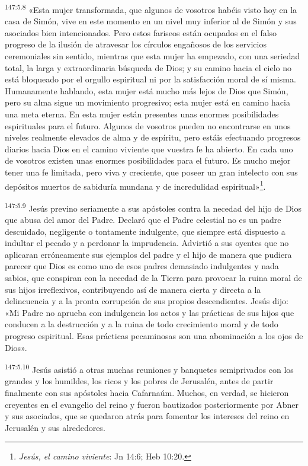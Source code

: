 \par 
\textsuperscript{147:5.8} «Esta mujer transformada, que algunos de vosotros habéis visto hoy en la casa de Simón, vive en este momento en un nivel muy inferior al de Simón y sus asociados bien intencionados. Pero estos fariseos están ocupados en el falso progreso de la ilusión de atravesar los círculos engañosos de los servicios ceremoniales sin sentido, mientras que esta mujer ha empezado, con una seriedad total, la larga y extraordinaria búsqueda de Dios; y su camino hacia el cielo no está bloqueado por el orgullo espiritual ni por la satisfacción moral de sí misma. Humanamente hablando, esta mujer está mucho más lejos de Dios que Simón, pero su alma sigue un movimiento progresivo; esta mujer está en camino hacia una meta eterna. En esta mujer están presentes unas enormes posibilidades espirituales para el futuro. Algunos de vosotros pueden no encontrarse en unos niveles realmente elevados de alma y de espíritu, pero estáis efectuando progresos diarios hacia Dios en el camino viviente que vuestra fe ha abierto. En cada uno de vosotros existen unas enormes posibilidades para el futuro. Es mucho mejor tener una fe limitada, pero viva y creciente, que poseer un gran intelecto con sus depósitos muertos de sabiduría mundana y de incredulidad espiritual»\footnote{\textit{Jesús, el camino viviente}: Jn 14:6; Heb 10:20.}.

\par 
\textsuperscript{147:5.9} Jesús previno seriamente a sus apóstoles contra la necedad del hijo de Dios que abusa del amor del Padre. Declaró que el Padre celestial no es un padre descuidado, negligente o tontamente indulgente, que siempre está dispuesto a indultar el pecado y a perdonar la imprudencia. Advirtió a sus oyentes que no aplicaran erróneamente sus ejemplos del padre y el hijo de manera que pudiera parecer que Dios es como uno de esos padres demasiado indulgentes y nada sabios, que conspiran con la necedad de la Tierra para provocar la ruina moral de sus hijos irreflexivos, contribuyendo así de manera cierta y directa a la delincuencia y a la pronta corrupción de sus propios descendientes. Jesús dijo: «Mi Padre no aprueba con indulgencia los actos y las prácticas de sus hijos que conducen a la destrucción y a la ruina de todo crecimiento moral y de todo progreso espiritual. Esas prácticas pecaminosas son una abominación a los ojos de Dios».

\par 
\textsuperscript{147:5.10} Jesús asistió a otras muchas reuniones y banquetes semiprivados con los grandes y los humildes, los ricos y los pobres de Jerusalén, antes de partir finalmente con sus apóstoles hacia Cafarnaúm. Muchos, en verdad, se hicieron creyentes en el evangelio del reino y fueron bautizados posteriormente por Abner y sus asociados, que se quedaron atrás para fomentar los intereses del reino en Jerusalén y sus alrededores.

